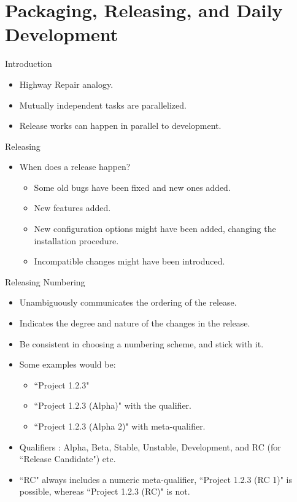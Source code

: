\documentclass{beamer}
\begin{document}
\section{Packaging, Releasing, and Daily Development}
\begin{frame}{Introduction}
\begin{itemize}
	\item Highway Repair analogy.	
	\item Mutually independent tasks are parallelized. 
	\item Release works can happen in parallel to development. 
\end{itemize}
\end{frame}

\begin{frame}{Releasing}
\begin{itemize}
	\item When does a release happen? 
	\begin{itemize}
		\item Some old bugs have been fixed  and new ones added. 
		\item New features added. 
		\item New configuration options might have been added, changing the installation procedure. 
		\item Incompatible changes might have been introduced. 
	\end{itemize}
\end{itemize}
\end{frame}

\begin{frame}{Releasing Numbering}
\begin{itemize}
	\item Unambiguously communicates the ordering of the release. 
	\item Indicates the degree and nature of the changes in the release. 
	\item Be consistent in choosing a numbering scheme, and stick with it. 
	\item Some examples would be:
	\begin{itemize}
		\item ``Project 1.2.3" 
		\item ``Project 1.2.3 (Alpha)" with the qualifier.
		\item ``Project 1.2.3 (Alpha 2)" with meta-qualifier.
	\end{itemize}
	\item Qualifiers : Alpha, Beta, Stable, Unstable, Development, and RC (for ``Release Candidate") etc.
	\item ``RC" always includes a numeric meta-qualifier, ``Project 1.2.3 (RC 1)" is possible, whereas ``Project 1.2.3 (RC)" is not. 		
\end{itemize}
\end{frame}
\end{document}
